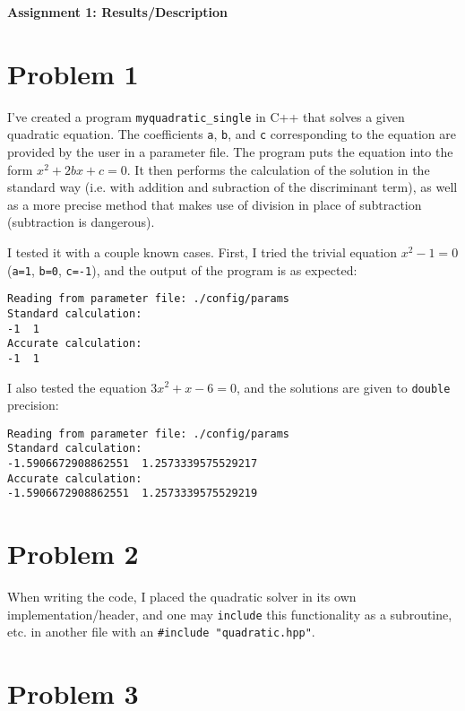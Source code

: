 \documentclass[12pt]{article}
\begin{document}
\begin{center}\begin{LARGE}
\textbf{Assignment 1: Results/Description}
\end{LARGE}\end{center}

\section*{Problem 1}

I've created a program \texttt{myquadratic_single} in C++ that solves a given
quadratic equation. The coefficients \texttt{a}, \texttt{b}, and \texttt{c}
corresponding to the equation are provided by the user in a parameter file. The
program puts the equation into the form $x^2 + 2bx + c = 0$. It then performs
the calculation of the solution in the standard way (i.e. with addition and
subraction of the discriminant term), as well as a more precise method that
makes use of division in place of subtraction (subtraction is dangerous).

I tested it with a couple known cases. First, I tried the trivial equation
$x^2 - 1 = 0$ (\texttt{a=1}, \texttt{b=0}, \texttt{c=-1}), and the output of
the program is as expected:
\begin{verbatim}
Reading from parameter file: ./config/params
Standard calculation:
-1  1
Accurate calculation:
-1  1
\end{verbatim}

I also tested the equation $3x^2 + x - 6 = 0$, and the solutions are given to
\texttt{double} precision:
\begin{verbatim}
Reading from parameter file: ./config/params
Standard calculation:
-1.5906672908862551  1.2573339575529217
Accurate calculation:
-1.5906672908862551  1.2573339575529219
\end{verbatim}

\section*{Problem 2}

When writing the code, I placed the quadratic solver in its own
implementation/header, and one may \texttt{include} this functionality as a
subroutine, etc. in another file with an \texttt{\#include "quadratic.hpp"}.

\section*{Problem 3}
\end{document}
